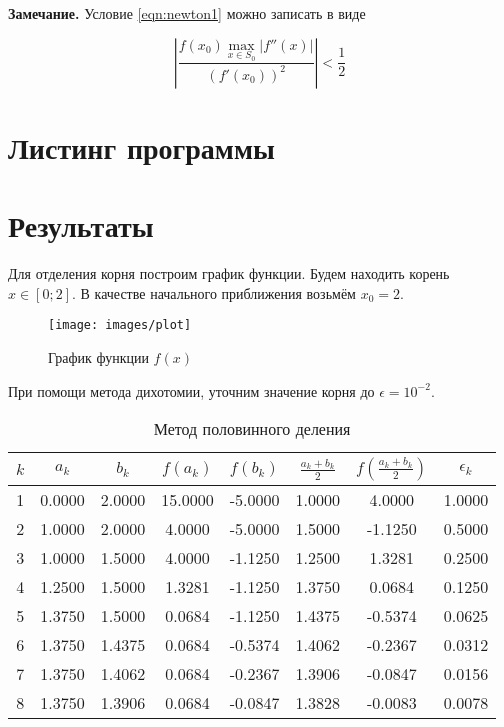 \documentclass[12pt, a4paper]{article}
\begin{document}
	 \textbf{Замечание.} Условие \eqref{eqn:newton1} можно записать в виде
	 
	 \begin{equation} \label{eqn:newton3}
	 	\left|
	 		 \frac{f(x_0) \max_{x\in S_0} |f''(x)|}
	 		 	  {(f'(x_0))^2}
	 	\right|
	 	 < 
	 	 \frac{1}{2}
	 \end{equation}

	 \section{Листинг программы}
	 
	 
	 
	 
	 \section{Результаты}
	 
	 Для отделения корня построим график функции. Будем находить корень $x \in [0; 2]$. В качестве начального приближения возьмём $x_0 = 2$.
	 
	 \begin{figure}[H]
	 	\texttt{[image: images/plot]}
	 	\centering
	 	\caption{График функции $f(x)$}
	 	\label{img:1}
	 	\centering
	 \end{figure}
	 
	 
	 При помощи метода дихотомии, уточним значение корня до $\epsilon = 10^{-2}$.
	 
	 \begin{table}[H]
	 	\label{tabl}
	 	\centering
	 	\begin{tabular}{|c|c|c|c|c|c|c|c|}
	 		\hline 
	 		$k$ & $a_k$ & $b_k$ & $f(a_k)$ & $f(b_k)$ & $\frac{a_k+b_k}{2}$ & $f(\frac{a_k+b_k}{2})$ & $\epsilon_k$  \\ 
	 		\hline
			1 & 0.0000 & 2.0000 & 15.0000 & -5.0000 & 1.0000 & 4.0000 & 1.0000 \\
			\hline
			2 & 1.0000 & 2.0000 & 4.0000 & -5.0000 & 1.5000 & -1.1250 & 0.5000 \\
			\hline
			3 & 1.0000 & 1.5000 & 4.0000 & -1.1250 & 1.2500 & 1.3281 & 0.2500 \\
			\hline
			4 & 1.2500 & 1.5000 & 1.3281 & -1.1250 & 1.3750 & 0.0684 & 0.1250 \\
			\hline
			5 & 1.3750 & 1.5000 & 0.0684 & -1.1250 & 1.4375 & -0.5374 & 0.0625 \\
			\hline
			6 & 1.3750 & 1.4375 & 0.0684 & -0.5374 & 1.4062 & -0.2367 & 0.0312 \\
			\hline
			7 & 1.3750 & 1.4062 & 0.0684 & -0.2367 & 1.3906 & -0.0847 & 0.0156 \\
			\hline
			8 & 1.3750 & 1.3906 & 0.0684 & -0.0847 & 1.3828 & -0.0083 & 0.0078 \\
			\hline
	 	\end{tabular} 
		\caption{Метод половинного деления}
		\label{table:1}
	 \end{table}
 
\end{document}
